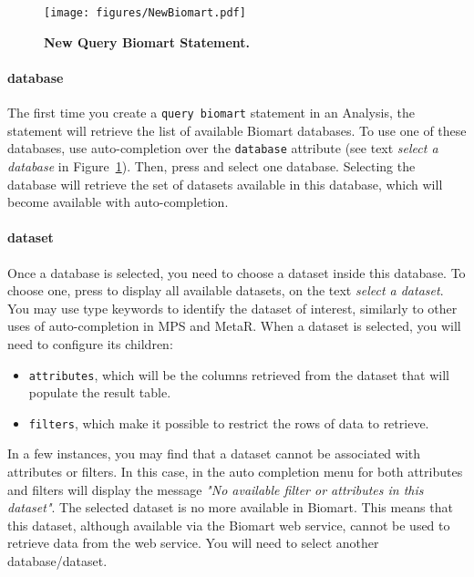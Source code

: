  \begin{figure}[h!tbp]
  \centering
  \texttt{[image: figures/NewBiomart.pdf]}
\caption[New Query Biomart Statement.]{\textbf{New Query Biomart Statement.}}
\label{fig:NewBiomart}
\end{figure}


\paragraph{database}
The first time you create a \texttt{query biomart} statement in an Analysis, the statement will retrieve the list of available Biomart databases. To use one of these databases, use auto-completion over the \texttt{database} attribute (see  text \textit{select a database} in Figure~\ref{fig:NewBiomart}). Then, press \keys{\ctrl+\space} and select one database. Selecting the database will retrieve the set of datasets available in this database, which will become available with auto-completion.


 \paragraph{dataset} 
Once a database is selected, you need to choose a dataset inside this database. To choose one, press \keys{\ctrl+\space} to display all available datasets, on the text \textit{select a dataset}. You may use type keywords to identify the dataset of interest, similarly to other uses of auto-completion in MPS and MetaR. When a dataset is selected, you will need to configure its children:
\begin{itemize}

\item \texttt{attributes}, which will be the columns retrieved from the dataset that will populate the result table.
\item \texttt{filters}, which make it possible  to restrict the rows of data to retrieve.
\end{itemize}

\begin{remark}
In a few instances, you may find that a dataset cannot be associated with attributes or filters. In this case, in the auto completion menu for both attributes and filters will display the message \textit{"No available filter or attributes in this dataset"}. The selected dataset is no more available in Biomart. This means that this dataset, although available via the Biomart web service, cannot be used to retrieve data from the web service. You will need to select another database/dataset. 
\end{remark}

